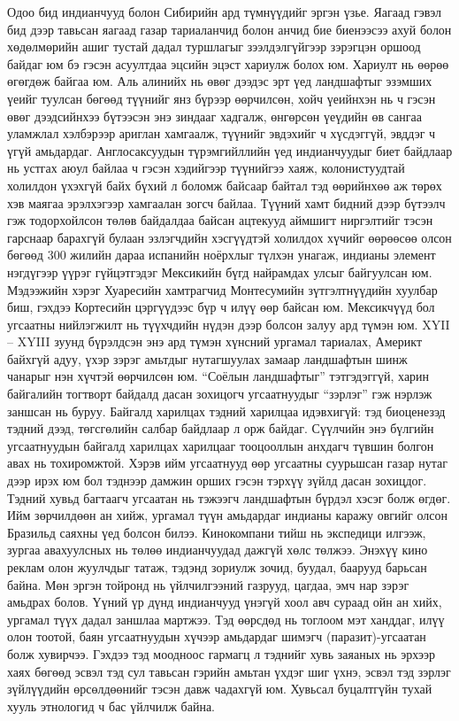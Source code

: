 Одоо бид индианчууд болон Сибирийн ард түмнүүдийг эргэн үзье. Яагаад гэвэл бид дээр тавьсан яагаад газар тариаланчид болон анчид бие биенээсээ ахуй болон хөдөлмөрийн ашиг тустай дадал туршлагыг зээлдэлгүйгээр зэрэгцэн оршоод байдаг юм бэ гэсэн асуултдаа эцсийн эцэст хариулж болох юм. Хариулт нь өөрөө өгөгдөж байгаа юм. Аль алинийх нь өвөг дээдэс эрт үед ландшафтыг эзэмших үеийг туулсан бөгөөд түүнийг янз бүрээр өөрчилсөн, хойч үеийнхэн нь ч гэсэн өвөг дээдсийнхээ бүтээсэн энэ зиндааг хадгалж, өнгөрсөн үеүдийн өв сангаа уламжлал хэлбэрээр ариглан хамгаалж, түүнийг эвдэхийг ч хүсдэггүй, эвддэг ч үгүй амьдардаг. Англосаксуудын түрэмгийллийн үед индианчуудыг биет байдлаар нь устгах аюул байлаа ч гэсэн хэдийгээр түүнийгээ хаяж, колонистуудтай холилдон үхэхгүй байх бүхий л боломж байсаар байтал тэд өөрийнхөө аж төрөх хэв маягаа эрэлхэгээр хамгаалан зогсч байлаа.
Түүний хамт бидний дээр бүтээлч гэж тодорхойлсон төлөв байдалдаа байсан ацтекууд аймшигт ниргэлтийг тэсэн гарснаар барахгүй булаан эзлэгчдийн хэсгүүдтэй холилдох хүчийг өөрөөсөө олсон бөгөөд 300 жилийн дараа испанийн ноёрхлыг түлхэн унагаж, индианы элемент нэгдүгээр үүрэг гүйцэтгэдэг Мексикийн бүгд найрамдах улсыг байгуулсан юм. Мэдээжийн хэрэг Хуаресийн хамтрагчид Монтесумийн зүтгэлтнүүдийн хуулбар биш, гэхдээ Кортесийн цэргүүдээс бүр ч илүү өөр байсан юм. Мексикчүүд бол угсаатны нийлэгжилт нь түүхчдийн нүдэн дээр болсон залуу ард түмэн юм. XYII – XYIII зуунд бүрэлдсэн энэ ард түмэн хүнсний ургамал тариалах, Америкт байхгүй адуу, үхэр зэрэг амьтдыг нутагшуулах замаар ландшафтын шинж чанарыг нэн хүчтэй өөрчилсөн юм.
“Соёлын ландшафтыг” тэтгэдэггүй, харин байгалийн тогтворт байдалд дасан зохицогч угсаатнуудыг “зэрлэг” гэж нэрлэж заншсан нь буруу. Байгалд харилцах тэдний харилцаа идэвхигүй: тэд биоценезэд тэдний дээд, төгсгөлийн салбар байдлаар л орж байдаг. Сүүлчийн энэ бүлгийн угсаатнуудын байгалд харилцах харилцааг тооцооллын анхдагч түвшин болгон авах нь тохиромжтой. Хэрэв ийм угсаатнууд өөр угсаатны суурьшсан газар нутаг дээр ирэх юм бол тэднээр дамжин орших гэсэн тэрхүү зүйлд дасан зохицдог. Тэдний хувьд багтаагч угсаатан нь тэжээгч ландшафтын бүрдэл хэсэг болж өгдөг. Ийм зөрчилдөөн ан хийж, ургамал түүн амьдардаг индианы каражу овгийг олсон Бразильд саяхны үед болсон билээ. Кинокомпани тийш нь экспедици илгээж, зургаа авахуулсных нь төлөө индианчуудад дажгүй хөлс төлжээ. Энэхүү кино реклам олон жуулчдыг татаж, тэдэнд зориулж зочид, буудал, баарууд барьсан байна. Мөн эргэн тойронд нь үйлчилгээний газрууд, цагдаа, эмч нар зэрэг амьдрах болов. Үүний үр дүнд индианчууд үнэгүй хоол авч сураад ойн ан хийх, ургамал түүх дадал заншлаа мартжээ. Тэд өөрсдөд нь тоглоом мэт ханддаг, илүү олон тоотой, баян угсаатнуудын хүчээр амьдардаг шимэгч (паразит)-угсаатан болж хувирчээ. Гэхдээ тэд моодноос гармагц л тэднийг хувь заяаных нь эрхээр хаях бөгөөд эсвэл тэд сул тавьсан гэрийн амьтан үхдэг шиг үхнэ, эсвэл тэд зэрлэг зүйлүүдийн өрсөлдөөнийг тэсэн давж чадахгүй юм. Хувьсал буцалтгүйн тухай хууль этнологид ч бас үйлчилж байна.
